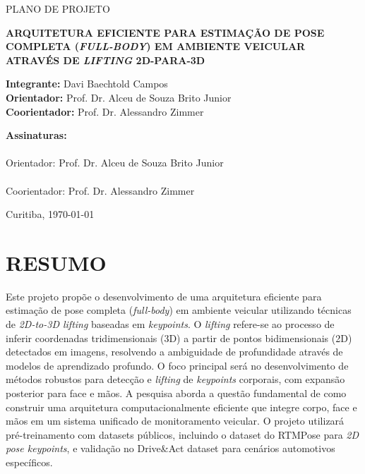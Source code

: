 \documentclass[12pt, a4paper]{article}
\begin{document}
\begin{titlepage}
    \centering
    {\large PLANO DE PROJETO \par}
    \vspace{1.5cm}
    {\bfseries\Large ARQUITETURA EFICIENTE PARA ESTIMAÇÃO DE POSE COMPLETA (\textit{FULL-BODY}) EM AMBIENTE VEICULAR ATRAVÉS DE \textit{LIFTING} 2D-PARA-3D \par}
    \vspace{2.5cm}

    \begin{flushleft}
        \textbf{Integrante:} Davi Baechtold Campos \\
        \textbf{Orientador:} Prof. Dr. Alceu de Souza Brito Junior \\
        \textbf{Coorientador:} Prof. Dr. Alessandro Zimmer
    \end{flushleft}

    \vfill
    \begin{flushleft}
        \textbf{Assinaturas:}\\[1.4cm]
        \makebox[9cm]{\hrulefill}\\
        \small Orientador: Prof. Dr. Alceu de Souza Brito Junior \\[1.6cm]
        \makebox[9cm]{\hrulefill}\\
        \small Coorientador: Prof. Dr. Alessandro Zimmer
    \end{flushleft}

    \vfill
    {\large Curitiba, \today \par}
\end{titlepage}

\tableofcontents
\newpage
\setcounter{page}{1}

\section{RESUMO}
Este projeto propõe o desenvolvimento de uma arquitetura eficiente para
estimação de pose completa (\textit{full-body}) em ambiente veicular utilizando
técnicas de \textit{2D-to-3D lifting} baseadas em \textit{keypoints}. O
\textit{lifting} refere-se ao processo de inferir coordenadas tridimensionais
(3D) a partir de pontos bidimensionais (2D) detectados em imagens, resolvendo a
ambiguidade de profundidade através de modelos de aprendizado profundo. O foco
principal será no desenvolvimento de métodos robustos para detecção e
\textit{lifting} de \textit{keypoints} corporais, com expansão posterior para
face e mãos. A pesquisa aborda a questão fundamental de como construir uma
arquitetura computacionalmente eficiente que integre corpo, face e mãos em um
sistema unificado de monitoramento veicular. O projeto utilizará
pré-treinamento com datasets públicos, incluindo o dataset do RTMPose para
\textit{2D pose keypoints}, e validação no Drive\&Act dataset para cenários
automotivos específicos.
\end{document}
